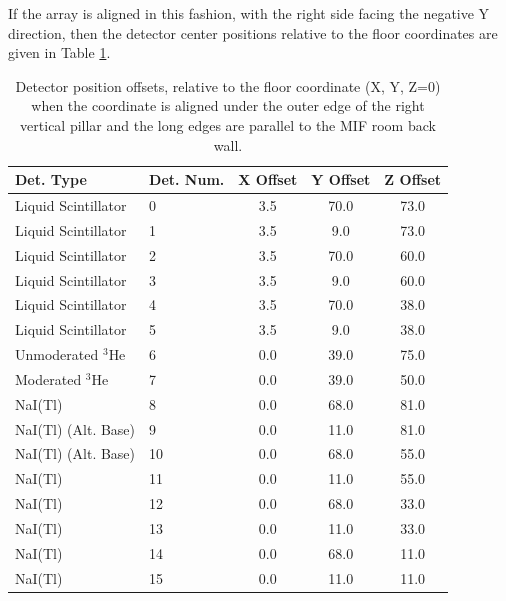 \documentclass[onecolumn, 10pt, letterpaper, twoside]{article}
\newcommand{\nuc}[2] {$^{#1}$#2}
\begin{document}
If the array is aligned in this fashion, with the right side facing the negative Y direction, then the detector center positions relative to the floor coordinates are given in Table \ref{tab:Det-Offsets}.

\begin{table}[h!]
\caption{Detector position offsets, relative to the floor coordinate (X, Y, Z=0) when the coordinate is aligned under the outer edge of the right vertical pillar and the long edges are parallel to the MIF room back wall.\label{tab:Det-Offsets}}
\begin{center}
\begin{tabular}{|l|l|c|c|c|}
\hline
Det. Type & Det. Num. & X Offset & Y Offset & Z Offset \\
\hline
\hline
Liquid Scintillator & 0 & 3.5 & 70.0 & 73.0 \\
Liquid Scintillator & 1 & 3.5 & 9.0 & 73.0 \\
Liquid Scintillator & 2 & 3.5 & 70.0 & 60.0 \\
Liquid Scintillator & 3 & 3.5 & 9.0 & 60.0 \\
Liquid Scintillator & 4 & 3.5 & 70.0 & 38.0 \\
Liquid Scintillator & 5 & 3.5 & 9.0 & 38.0 \\
Unmoderated \nuc{3}{He} & 6 & 0.0 & 39.0 & 75.0 \\
Moderated \nuc{3}{He}& 7 & 0.0 & 39.0 & 50.0 \\
NaI(Tl) & 8 & 0.0 & 68.0 & 81.0 \\
NaI(Tl) (Alt. Base) & 9 & 0.0 & 11.0 & 81.0 \\
NaI(Tl) (Alt. Base) & 10 & 0.0 & 68.0 & 55.0 \\
NaI(Tl) & 11 & 0.0 & 11.0 & 55.0 \\
NaI(Tl) & 12 & 0.0 & 68.0 & 33.0 \\
NaI(Tl) & 13 & 0.0 & 11.0 & 33.0 \\
NaI(Tl) & 14 & 0.0 & 68.0 & 11.0 \\
NaI(Tl) & 15 & 0.0 & 11.0 & 11.0 \\
\hline
\end{tabular}
\end{center}
\end{table}

\clearpage
\end{document}
